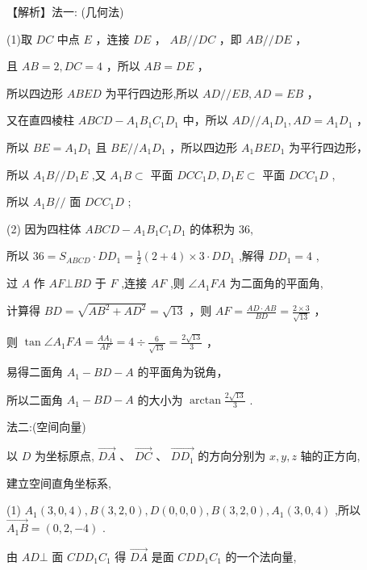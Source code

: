 \documentclass[10pt]{article}
\begin{document}
【解析】法一: (几何法)

(1)取 \({DC}\) 中点 \(E\) ，连接 \({DE}\) ， \({AB}//{DC}\) ，即 \({AB}//{DE}\) ，

且 \({AB} = 2,{DC} = 4\) ，所以 \({AB} = {DE}\) ，

所以四边形 \({ABED}\) 为平行四边形,所以 \({AD}//{EB},{AD} = {EB}\) ，

又在直四棱柱 \({ABCD} - {A}_{1}{B}_{1}{C}_{1}{D}_{1}\) 中，所以 \({AD}//{A}_{1}{D}_{1},{AD} = {A}_{1}{D}_{1}\) ，

所以 \({BE} = {A}_{1}{D}_{1}\) 且 \({BE}//{A}_{1}{D}_{1}\) ，所以四边形 \({A}_{1}{BE}{D}_{1}\) 为平行四边形，

所以 \({A}_{1}B//{D}_{1}E\) ,又 \({A}_{1}B \subset\) 平面 \({DC}{C}_{1}D,{D}_{1}E \subset\) 平面 \({DC}{C}_{1}D\) ,

所以 \({A}_{1}B//\) 面 \({DC}{C}_{1}D\) ;

(2) 因为四柱体 \({ABCD} - {A}_{1}{B}_{1}{C}_{1}{D}_{1}\) 的体积为 36,

所以 \({36} = {S}_{ABCD} \cdot  D{D}_{1} = \frac{1}{2}\left( {2 + 4}\right)  \times  3 \cdot  D{D}_{1}\) ,解得 \(D{D}_{1} = 4\) ,

过 \(A\) 作 \({AF} \bot  {BD}\) 于 \(F\) ,连接 \({AF}\) ,则 \(\angle {A}_{1}{FA}\) 为二面角的平面角,

计算得 \({BD} = \sqrt{A{B}^{2} + A{D}^{2}} = \sqrt{13}\) ，则 \({AF} = \frac{{AD} \cdot  {AB}}{BD} = \frac{2 \times  3}{\sqrt{13}}\) ，

则 \(\tan \angle {A}_{1}{FA} = \frac{A{A}_{1}}{AF} = 4 \div  \frac{6}{\sqrt{13}} = \frac{2\sqrt{13}}{3}\) ，

易得二面角 \({A}_{1} - {BD} - A\) 的平面角为锐角，

所以二面角 \({A}_{1} - {BD} - A\) 的大小为 \(\arctan \frac{2\sqrt{13}}{3}\) .

法二:(空间向量)

以 \(D\) 为坐标原点, \(\overrightarrow{DA}\text{ 、 }\overrightarrow{DC}\text{ 、 }\overrightarrow{D{D}_{1}}\) 的方向分别为 \(x,y,z\) 轴的正方向,

建立空间直角坐标系,

(1) \({A}_{1}\left( {3,0,4}\right) ,B\left( {3,2,0}\right) ,D\left( {0,0,0}\right) ,B\left( {3,2,0}\right) ,{A}_{1}\left( {3,0,4}\right)\) ,所以 \(\overrightarrow{{A}_{1}B} = \left( {0,2, - 4}\right)\) .

由 \({AD} \bot\) 面 \({CD}{D}_{1}{C}_{1}\) 得 \(\overrightarrow{DA}\) 是面 \({CD}{D}_{1}{C}_{1}\) 的一个法向量,
\end{document}
